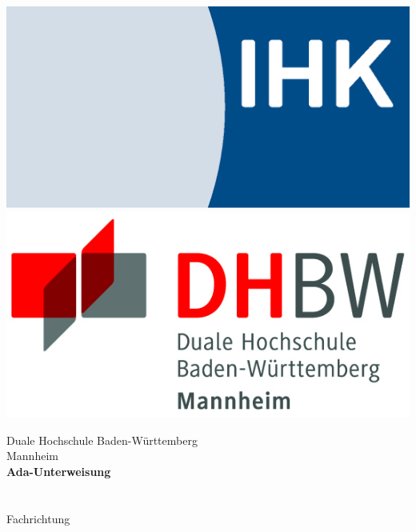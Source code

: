 \begin{titlepage}
\begin{minipage}{\textwidth}
		\vspace{-2cm}
		\noindent \includegraphics[scale=0.25]{img/ihk.eps} \hfill   \includegraphics[scale=0.79]{img/logo.jpg}
\end{minipage}
\vspace{1em}
\sffamily
\begin{center}
	\textsf{\large{}Duale Hochschule Baden-W\"urttemberg\\[1.5mm] Mannheim}\\[2em]
	\textsf{\textbf{\Large{}Ada-Unterweisung }}\\[3mm]
	\textsf{\textbf{\DerTitelDerArbeit}} \\[1.5cm]
	\textsf{\textbf{\Large{}\DieBerufsausbildung}\\[3mm] 
	\textsf{Fachrichtung \DieFachrichtungDerAusbildung}}
	
	\vspace{3em}
	\textsf{\Large{\Unterweisungsthema}}
\vfill

\begin{minipage}{\textwidth}


\end{minipage}
\end{center}
\end{titlepage}
